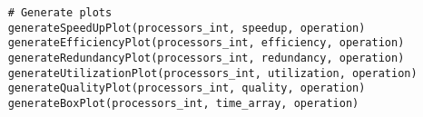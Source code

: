 \begin{center}
\begin{footnotesize}
\begin{verbatim}
    # Generate plots
    generateSpeedUpPlot(processors_int, speedup, operation)
    generateEfficiencyPlot(processors_int, efficiency, operation)
    generateRedundancyPlot(processors_int, redundancy, operation)
    generateUtilizationPlot(processors_int, utilization, operation)
    generateQualityPlot(processors_int, quality, operation)
    generateBoxPlot(processors_int, time_array, operation)
\end{verbatim}
\end{footnotesize}
\end{center}\vspace{4mm}